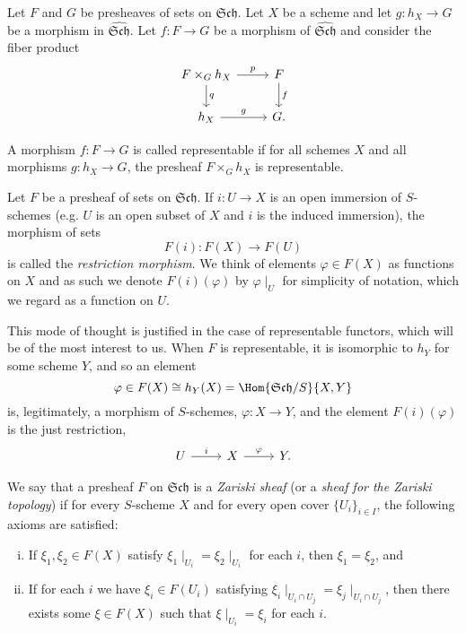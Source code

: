 \documentclass[10pt]{amsart}
\begin{document}
Let $F$ and $G$ be presheaves of sets on $\mathfrak{Sch}$.
Let $X$ be a scheme and let $g \colon h_X \rightarrow G$ be a morphism in $\hat{\mathfrak{Sch}}$.
Let $f \colon F \rightarrow G$ be a morphism of $\hat{\mathfrak{Sch}}$ and consider the fiber product
$$\begin{tikzcd}
  F \times_G h_X \arrow{r}{p}\arrow{d}{q} & F\arrow{d}{f}\\
  h_X \arrow{r}{g} & G.
\end{tikzcd}$$

\begin{defn}
  A morphism $f \colon F \rightarrow G$ is called representable if for all schemes $X$ and all morphisms $g : h_X \rightarrow G$, the presheaf $F \times_G h_X$ is representable.
\end{defn}

Let $F$ be a presheaf of sets on $\mathfrak{Sch}$.
If $i : U \rightarrow X$ is an open immersion of $S$-schemes (e.g. $U$ is an open subset of $X$ and $i$ is the induced immersion), the morphism of sets
$$F(i) : F(X) \rightarrow F(U)$$
is called the {\em restriction morphism}.
We think of elements $\varphi \in F(X)$ as functions on $X$ and as such we denote $F(i)(\varphi)$ by  $\varphi\mid_U$ for simplicity of notation, which we regard as a function on $U$.

\begin{rmk}
  This mode of thought is justified in the case of representable functors, which will be of the most interest to us.  When $F$ is representable, it is isomorphic to $h_Y$ for some scheme $Y$, and so an element
  $$\varphi \in F(X) \cong h_Y(X) = \Hom{\mathfrak{Sch}/S}{X,Y}$$
  is, legitimately, a morphism of $S$-schemes, $\varphi : X \rightarrow Y$, and the element $F(i)(\varphi)$ is the just restriction,
  $$\begin{tikzcd}
    U \arrow{r}{i} & X\arrow{r}{\varphi} & Y.
  \end{tikzcd}$$
\end{rmk}

\begin{defn}
  We say that a presheaf $F$ on $\mathfrak{Sch}$ is a {\em Zariski sheaf} (or a {\em sheaf for the Zariski topology}) if for every $S$-scheme $X$ and for every open cover $\{U_i\}_{i \in I}$, the following axioms are satisfied:
  \begin{enumerate}[(i)]
  \item
    If $\xi_1, \xi_2 \in F(X)$ satisfy $\xi_1\mid_{U_i} = \xi_2\mid_{U_i}$ for each $i$, then $\xi_1 = \xi_2$, and
  \item
    If for each $i$ we have $\xi_i \in F(U_i)$ satisfying $\xi_i\mid_{U_i \cap U_j} = \xi_j\mid_{U_i \cap U_j}$, then there exists some $\xi \in F(X)$ such that $\xi\mid_{U_i} = \xi_i$ for each $i$.
  \end{enumerate}
\end{defn}
\end{document}
